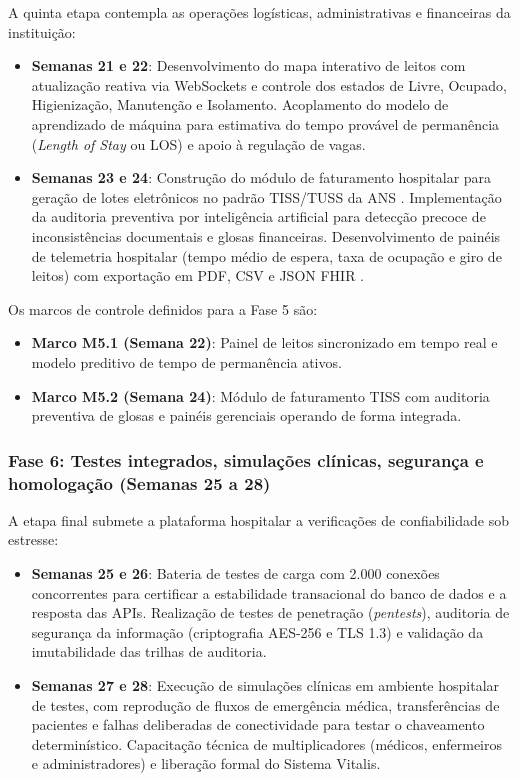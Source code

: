 A quinta etapa contempla as operações logísticas, administrativas e financeiras da instituição:
\begin{itemize}[leftmargin=*]
    \item \textbf{Semanas 21 e 22}: Desenvolvimento do mapa interativo de leitos com atualização reativa via WebSockets e controle dos estados de Livre, Ocupado, Higienização, Manutenção e Isolamento. Acoplamento do modelo de aprendizado de máquina para estimativa do tempo provável de permanência (\textit{Length of Stay} ou LOS) e apoio à regulação de vagas.
    \item \textbf{Semanas 23 e 24}: Construção do módulo de faturamento hospitalar para geração de lotes eletrônicos no padrão TISS/TUSS da ANS \cite{ans_tiss:2023}. Implementação da auditoria preventiva por inteligência artificial para detecção precoce de inconsistências documentais e glosas financeiras. Desenvolvimento de painéis de telemetria hospitalar (tempo médio de espera, taxa de ocupação e giro de leitos) com exportação em PDF, CSV e JSON FHIR \cite{hl7_fhir:2019}.
\end{itemize}

Os marcos de controle definidos para a Fase 5 são:
\begin{itemize}[leftmargin=*]
    \item \textbf{Marco M5.1 (Semana 22)}: Painel de leitos sincronizado em tempo real e modelo preditivo de tempo de permanência ativos.
    \item \textbf{Marco M5.2 (Semana 24)}: Módulo de faturamento TISS com auditoria preventiva de glosas e painéis gerenciais operando de forma integrada.
\end{itemize}

\subsubsection{Fase 6: Testes integrados, simulações clínicas, segurança e homologação (Semanas 25 a 28)}

A etapa final submete a plataforma hospitalar a verificações de confiabilidade sob estresse:
\begin{itemize}[leftmargin=*]
    \item \textbf{Semanas 25 e 26}: Bateria de testes de carga com 2.000 conexões concorrentes para certificar a estabilidade transacional do banco de dados e a resposta das APIs. Realização de testes de penetração (\textit{pentests}), auditoria de segurança da informação (criptografia AES-256 e TLS 1.3) e validação da imutabilidade das trilhas de auditoria.
    \item \textbf{Semanas 27 e 28}: Execução de simulações clínicas em ambiente hospitalar de testes, com reprodução de fluxos de emergência médica, transferências de pacientes e falhas deliberadas de conectividade para testar o chaveamento determinístico. Capacitação técnica de multiplicadores (médicos, enfermeiros e administradores) e liberação formal do Sistema Vitalis.
\end{itemize}

